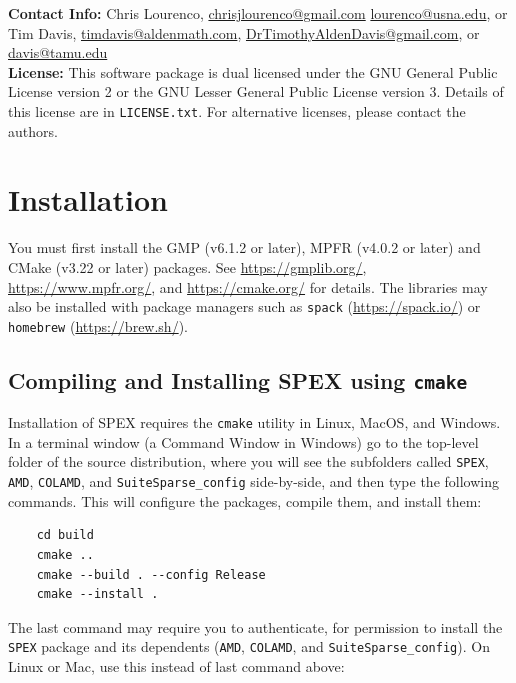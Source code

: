 \documentclass[12pt,oneside]{book}
\theoremstyle{definition}
\begin{document}
\noindent \textbf{Contact Info:} Chris Lourenco,
\href{mailto:chrisjlourenco@gmail.com}{chrisjlourenco@gmail.com} \href{mailto:lourenco@usna.edu}{lourenco@usna.edu}, or Tim Davis,
\href{mailto:timdavis@aldenmath.com}{timdavis@aldenmath.com},
\href{mailto:DrTimothyAldenDavis@gmail.com}{DrTimothyAldenDavis@gmail.com}, or \href{mailto:davis@tamu.edu}{davis@tamu.edu}\\

\noindent \textbf{License:} This software package is dual licensed under the GNU General Public License version 2 or the GNU Lesser General Public License version 3. Details of this license are in \verb|LICENSE.txt|. For alternative licenses, please contact the authors.


\section{Installation} \label{s:util:install}
You must first install the GMP (v6.1.2 or later), MPFR (v4.0.2 or later) and CMake
(v3.22 or later) packages.
See \url{https://gmplib.org/}, \url{https://www.mpfr.org/}, and \url{https://cmake.org/}
for details.  
The libraries may also be installed with package
managers such as \verb'spack' (\url{https://spack.io/}) or \verb'homebrew' (\url{https://brew.sh/}).

\subsection{Compiling and Installing SPEX using {\tt cmake}}

Installation of SPEX requires the \verb|cmake| utility in Linux, MacOS, and Windows.
In a terminal window (a Command Window in Windows) go to the top-level folder of the
source distribution, where you will see the subfolders called \verb'SPEX', \verb'AMD',
\verb'COLAMD', and \verb'SuiteSparse_config' side-by-side, and then type the following
commands.  This will configure the packages, compile them, and install them:

\begin{verbatim}
    cd build
    cmake ..
    cmake --build . --config Release
    cmake --install .
\end{verbatim}

The last command may require you to authenticate, for permission to install the \verb'SPEX'
package and its dependents (\verb'AMD', \verb'COLAMD', and \verb'SuiteSparse_config').
On Linux or Mac, use this instead of last command above:
\end{document}
